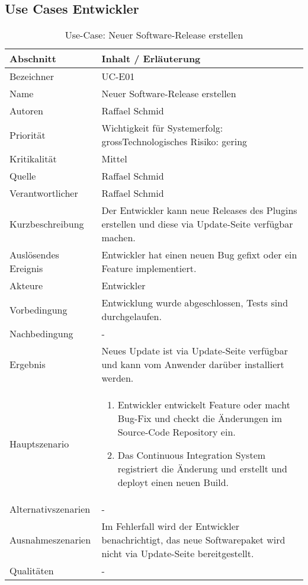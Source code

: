 \subsection{Use Cases Entwickler}
\begin{longtable}{|p{4cm}|p{10.5cm}|}
\caption{Use-Case: Neuer Software-Release erstellen}\\\hline
   \textbf{Abschnitt} & \textbf{Inhalt / Erläuterung} \\\hline
   Bezeichner & UC-E01\\\hline
   Name & Neuer Software-Release erstellen\\\hline
   Autoren & Raffael Schmid\\\hline
   Priorität & Wichtigkeit für Systemerfolg: gross\newline Technologisches Risiko: gering\\\hline
   Kritikalität & Mittel\\\hline
   Quelle & Raffael Schmid\\\hline
   Verantwortlicher & Raffael Schmid\\\hline
   Kurzbeschreibung & Der Entwickler kann neue Releases des Plugins erstellen und diese via Update-Seite verfügbar machen.\\\hline
   Auslösendes Ereignis & Entwickler hat einen neuen Bug gefixt oder ein Feature implementiert.\\\hline
   Akteure & Entwickler\\\hline
   Vorbedingung & Entwicklung wurde abgeschlossen, Tests sind durchgelaufen.\\\hline
   Nachbedingung & -\\\hline
   Ergebnis & Neues Update ist via Update-Seite verfügbar und kann vom Anwender darüber installiert werden.\\\hline
   Hauptszenario & 
	\begin{enumerate}
		\item Entwickler entwickelt Feature oder macht Bug-Fix und checkt die Änderungen im Source-Code Repository ein.
		\item Das Continuous Integration System registriert die Änderung und erstellt und deployt einen neuen Build.
	\end{enumerate}
	\\\hline
   Alternativszenarien & -\\\hline
   Ausnahmeszenarien & Im Fehlerfall wird der Entwickler benachrichtigt, das neue Softwarepaket wird nicht via Update-Seite bereitgestellt.\\\hline
   Qualitäten & - \\\hline
\end{longtable}



